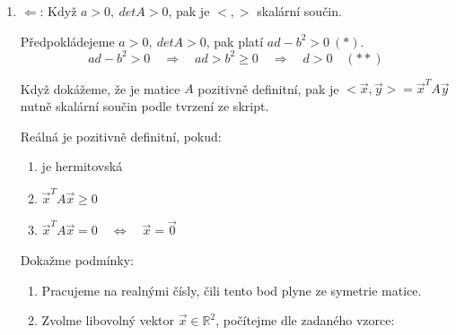 \documentclass[12pt]{article}
\begin{document}
\begin{enumerate}
  

























  \item $\Leftarrow$: Když $a>0,\ detA>0$, pak je $<,>$ skalární součin.
    \medskip

    Předpokládejeme $a>0,\ detA>0$, pak platí $ad-b^2 > 0 \ (*)$.
    \[
      ad-b^2 > 0 \quad \Rightarrow \quad ad>b^2\geq0 \quad \Rightarrow \quad d>0 \quad (**)
    \]

    Když dokážeme, že je matice $A$ pozitivně definitní, pak je $<\vec{x},\vec{y}> = \vec{x}^T A \vec{y}$
    nutně skalární součin podle tvrzení ze skript.

    Reálná je pozitivně definitní, pokud:
    \begin{enumerate}
      \item je hermitovská
      \item $\vec{x}^T A \vec{x} \geq 0$
      \item $\vec{x}^T A \vec{x} = 0 \quad \Longleftrightarrow \quad \vec{x} = \vec{0}$
    \end{enumerate}

    Dokažme podmínky:

    \begin{enumerate}
      \item Pracujeme na realnými čísly, čili tento bod plyne ze symetrie matice.
      \item Zvolme libovolný vektor $\vec{x} \in \mathbb{R}^2$, počítejme dle zadaného vzorce:
      

\end{enumerate}
\end{enumerate}
\end{document}
